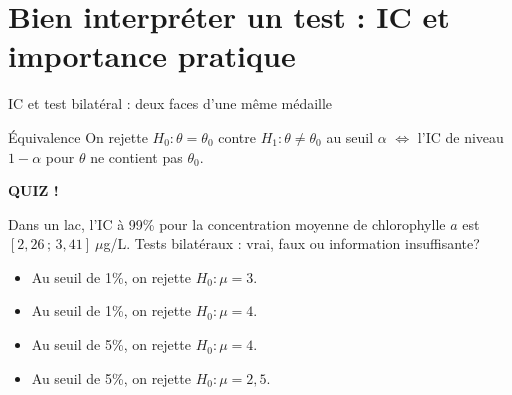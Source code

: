 \documentclass{BeamerTemplate}
\begin{document}
\section{Bien interpréter un test : IC et importance pratique}

\begin{frame}[t]{IC et test bilatéral : deux faces d'une même médaille}
  \begin{Boite}{Équivalence}
    On rejette $H_0 : \theta = \theta_0$ contre $H_1 : \theta \ne \theta_0$ au seuil $\alpha$
    $\iff$ l'IC de niveau $1-\alpha$ pour $\theta$ \alert{ne contient pas} $\theta_0$.
  \end{Boite}

  \vspace{-1mm}

  \medskip

\end{frame}

\begin{frame}[plain,t]
  \centerline{\LARGE\bfseries\alert{QUIZ !}}

  \medskip
  Dans un lac, l'IC à 99\% pour la concentration moyenne de chlorophylle $a$ est $[2{,}26 \,;\, 3{,}41]\ \mu$g/L. Tests bilatéraux : vrai, faux ou information insuffisante?
  \begin{itemize}\itemsep 1.0cm
    \item Au seuil de 1\%, on rejette $H_0 : \mu = 3$.
    \item<2-> Au seuil de 1\%, on rejette $H_0 : \mu = 4$.
    \item<3-> Au seuil de 5\%, on rejette $H_0 : \mu = 4$.
    \item<4-> Au seuil de 5\%, on rejette $H_0 : \mu = 2{,}5$.
  \end{itemize}
\end{frame}
\end{document}
